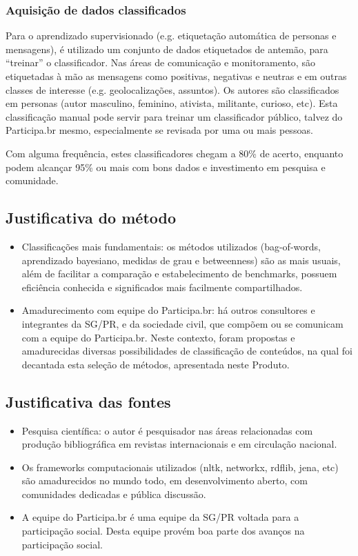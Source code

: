 \documentclass[12pt]{article}
\begin{document}
\subsubsection{Aquisição de dados classificados}
Para o aprendizado supervisionado (e.g. etiquetação automática de personas e mensagens), é utilizado um conjunto de dados etiquetados de antemão, para “treinar” o classificador.
Nas áreas de comunicação e monitoramento, são etiquetadas à mão as mensagens como positivas, negativas e neutras e em outras classes de interesse (e.g. geolocalizações, assuntos). Os autores são classificados em personas (autor masculino, feminino, ativista, militante, curioso, etc). Esta classificação manual pode servir para treinar um classificador público, talvez do Participa.br mesmo, especialmente se revisada por uma ou mais pessoas.

Com alguma frequência, estes classificadores chegam a 80\% de acerto, enquanto podem alcançar 95\% ou mais com bons dados e investimento em pesquisa e comunidade.
\subsection{Justificativa do método}
\begin{itemize}
    \item Classificações mais fundamentais: os métodos utilizados (bag-of-words, aprendizado bayesiano, medidas de grau e betweenness) são as mais usuais, além de facilitar a comparação e estabelecimento de benchmarks, possuem eficiência conhecida e significados mais facilmente compartilhados.
    \item Amadurecimento com equipe do Participa.br: há outros consultores e integrantes da SG/PR, e da sociedade civil, que compõem ou se comunicam com a equipe do Participa.br. Neste contexto, foram propostas e amadurecidas diversas possibilidades de classificação de conteúdos, na qual foi decantada esta seleção de métodos, apresentada neste Produto.
\end{itemize}
\subsection{Justificativa das fontes}
\begin{itemize}
    \item Pesquisa científica: o autor é pesquisador nas áreas relacionadas com produção bibliográfica em revistas internacionais e em circulação nacional.
    \item Os frameworks computacionais utilizados (nltk, networkx, rdflib, jena, etc) são amadurecidos no mundo todo, em desenvolvimento aberto, com comunidades dedicadas e pública discussão.
    \item A equipe do Participa.br é uma equipe da SG/PR voltada para a participação social. Desta equipe provém boa parte dos avanços na participação social.
\end{itemize}
\end{document}
